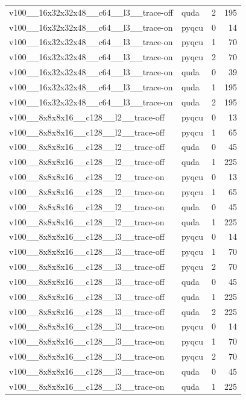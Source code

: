 \begin{table}[htbp]
\begin{tabular}{@{}llrr@{}}
v100\_\_16x32x32x48\_\_c64\_\_l3\_\_trace-off & quda & 2 & 195 \\
v100\_\_16x32x32x48\_\_c64\_\_l3\_\_trace-on & pyqcu & 0 & 14 \\
v100\_\_16x32x32x48\_\_c64\_\_l3\_\_trace-on & pyqcu & 1 & 70 \\
v100\_\_16x32x32x48\_\_c64\_\_l3\_\_trace-on & pyqcu & 2 & 70 \\
v100\_\_16x32x32x48\_\_c64\_\_l3\_\_trace-on & quda & 0 & 39 \\
v100\_\_16x32x32x48\_\_c64\_\_l3\_\_trace-on & quda & 1 & 195 \\
v100\_\_16x32x32x48\_\_c64\_\_l3\_\_trace-on & quda & 2 & 195 \\
v100\_\_8x8x8x16\_\_c128\_\_l2\_\_trace-off & pyqcu & 0 & 13 \\
v100\_\_8x8x8x16\_\_c128\_\_l2\_\_trace-off & pyqcu & 1 & 65 \\
v100\_\_8x8x8x16\_\_c128\_\_l2\_\_trace-off & quda & 0 & 45 \\
v100\_\_8x8x8x16\_\_c128\_\_l2\_\_trace-off & quda & 1 & 225 \\
v100\_\_8x8x8x16\_\_c128\_\_l2\_\_trace-on & pyqcu & 0 & 13 \\
v100\_\_8x8x8x16\_\_c128\_\_l2\_\_trace-on & pyqcu & 1 & 65 \\
v100\_\_8x8x8x16\_\_c128\_\_l2\_\_trace-on & quda & 0 & 45 \\
v100\_\_8x8x8x16\_\_c128\_\_l2\_\_trace-on & quda & 1 & 225 \\
v100\_\_8x8x8x16\_\_c128\_\_l3\_\_trace-off & pyqcu & 0 & 14 \\
v100\_\_8x8x8x16\_\_c128\_\_l3\_\_trace-off & pyqcu & 1 & 70 \\
v100\_\_8x8x8x16\_\_c128\_\_l3\_\_trace-off & pyqcu & 2 & 70 \\
v100\_\_8x8x8x16\_\_c128\_\_l3\_\_trace-off & quda & 0 & 45 \\
v100\_\_8x8x8x16\_\_c128\_\_l3\_\_trace-off & quda & 1 & 225 \\
v100\_\_8x8x8x16\_\_c128\_\_l3\_\_trace-off & quda & 2 & 225 \\
v100\_\_8x8x8x16\_\_c128\_\_l3\_\_trace-on & pyqcu & 0 & 14 \\
v100\_\_8x8x8x16\_\_c128\_\_l3\_\_trace-on & pyqcu & 1 & 70 \\
v100\_\_8x8x8x16\_\_c128\_\_l3\_\_trace-on & pyqcu & 2 & 70 \\
v100\_\_8x8x8x16\_\_c128\_\_l3\_\_trace-on & quda & 0 & 45 \\
v100\_\_8x8x8x16\_\_c128\_\_l3\_\_trace-on & quda & 1 & 225 \\

\end{tabular}
\end{table}
